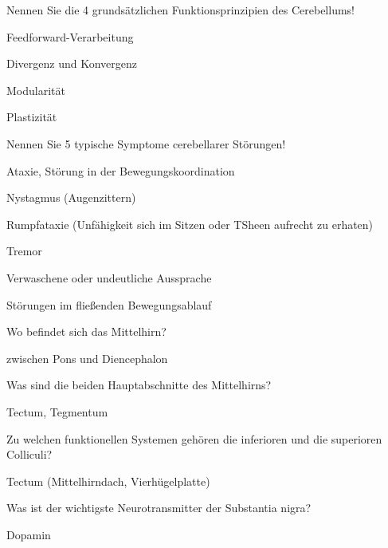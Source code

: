 \documentclass[10pt, a4paper]{exam}
\begin{document}
\begin{questions}
\begin{solution}
  \end{solution}

  \question Nennen Sie die 4 grundsätzlichen Funktionsprinzipien des Cerebellums!
  \begin{solution}
    \begin{itemize*}
      \item Feedforward-Verarbeitung
      \item Divergenz und Konvergenz
      \item Modularität
      \item Plastizität
    \end{itemize*}
  \end{solution}

  \question Nennen Sie 5 typische Symptome cerebellarer Störungen!
  \begin{solution}
    \begin{itemize*}
      \item Ataxie, Störung in der Bewegungskoordination
      \item Nystagmus (Augenzittern)
      \item Rumpfataxie (Unfähigkeit sich im Sitzen oder TSheen aufrecht zu erhaten)
      \item Tremor
      \item Verwaschene oder undeutliche Aussprache
      \item Störungen im fließenden Bewegungsablauf
    \end{itemize*}
  \end{solution}

  \question Wo befindet sich das Mittelhirn?
  \begin{solution}
    zwischen Pons und Diencephalon
  \end{solution}

  \question Was sind die beiden Hauptabschnitte des Mittelhirns?
  \begin{solution}
    Tectum, Tegmentum
  \end{solution}

  \question Zu welchen funktionellen Systemen gehören die inferioren und die superioren Colliculi?
  \begin{solution}
    Tectum (Mittelhirndach, Vierhügelplatte)
  \end{solution}

  \question Was ist der wichtigste Neurotransmitter der Substantia nigra?
  \begin{solution}
    Dopamin
  \end{solution}


\end{questions}
\end{document}
